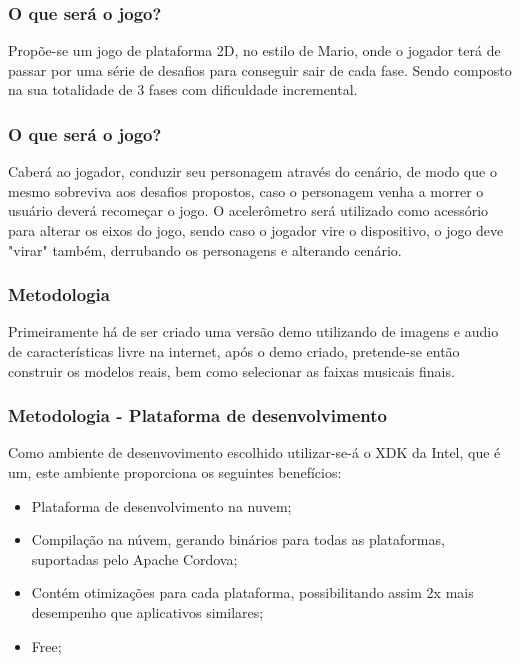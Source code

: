 \documentclass{beamer}
\begin{document}
\begin{frame}
\frametitle{O que será o jogo?}

Propõe-se um jogo de plataforma 2D, no estilo de Mario, onde o jogador terá de passar por uma série de desafios para conseguir sair de cada fase. Sendo composto na sua totalidade de 3 fases com dificuldade incremental. 

\end{frame}

\begin{frame}
\frametitle{O que será o jogo?}

Caberá ao jogador, conduzir seu personagem através do cenário, de modo que  o mesmo sobreviva aos desafios propostos, caso o personagem venha a morrer o usuário deverá recomeçar o jogo. O acelerômetro será utilizado como acessório para alterar os eixos do jogo, sendo caso o jogador vire o dispositivo, o jogo deve "virar" também, derrubando os personagens e alterando cenário.

\end{frame}

\begin{frame}
\frametitle{Metodologia}
	Primeiramente há de ser criado uma versão demo utilizando de imagens e audio de características livre na internet, após o demo criado, pretende-se então construir os modelos reais, bem como selecionar as faixas musicais finais.
\end{frame}


\begin{frame}
\frametitle{Metodologia - Plataforma de desenvolvimento}

Como ambiente de desenvovimento escolhido utilizar-se-á o XDK da Intel, que é um, este ambiente proporciona os seguintes benefícios:

\begin{itemize}
\item  Plataforma de desenvolvimento na nuvem;
\item Compilação na núvem, gerando binários para todas as plataformas, suportadas pelo Apache Cordova;
\item Contém otimizações para cada plataforma, possibilitando assim 2x mais desempenho que aplicativos similares;
\item Free;
\end{itemize}

\end{frame}
\end{document}
